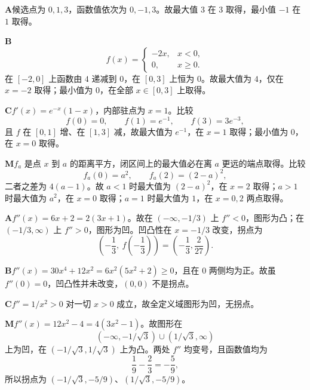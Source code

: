 \begin{solutionBox}
\textbf{A}\quad 候选点为 \(0,1,3\)，函数值依次为 \(0,-1,3\)。故最大值 \(3\) 在 \(3\) 取得，最小值 \(-1\) 在 \(1\) 取得。

\textbf{B}\quad
\[
f(x)=\begin{cases}-2x,&x<0,\\0,&x\ge0.\end{cases}
\]
在 \([-2,0]\) 上函数由 \(4\) 递减到 \(0\)，在 \([0,3]\) 上恒为 \(0\)。故最大值为 \(4\)，仅在 \(x=-2\) 取得；最小值为 \(0\)，在全部 \(x\in[0,3]\) 上取得。

\textbf{C}\quad \(f'(x)=e^{-x}(1-x)\)，内部驻点为 \(x=1\)。比较
\[
f(0)=0,\qquad f(1)=e^{-1},\qquad f(3)=3e^{-3},
\]
且 \(f\) 在 \([0,1]\) 增、在 \([1,3]\) 减，故最大值为 \(e^{-1}\)，在 \(x=1\) 取得；最小值为 \(0\)，在 \(x=0\) 取得。

\textbf{M}\quad \(f_a\) 是点 \(x\) 到 \(a\) 的距离平方，闭区间上的最大值必在离 \(a\) 更远的端点取得。比较
\[
f_a(0)=a^2,\qquad f_a(2)=(2-a)^2,
\]
二者之差为 \(4(a-1)\)。故 \(a<1\) 时最大值为 \((2-a)^2\)，在 \(x=2\) 取得；\(a>1\) 时最大值为 \(a^2\)，在 \(x=0\) 取得；\(a=1\) 时最大值为 \(1\)，在 \(x=0,2\) 两点取得。
\end{solutionBox}

\begin{solutionBox}
\textbf{A}\quad \(f''(x)=6x+2=2(3x+1)\)。故在 \((-\infty,-1/3)\) 上 \(f''<0\)，图形为凸；在 \((-1/3,\infty)\) 上 \(f''>0\)，图形为凹。凹凸性在 \(x=-1/3\) 改变，拐点为
\[
\left(-\frac13,\ f\!\left(-\frac13\right)\right)
=\left(-\frac13,\frac2{27}\right).
\]

\textbf{B}\quad \(f''(x)=30x^4+12x^2=6x^2(5x^2+2)\ge0\)，且在 \(0\) 两侧均为正。故虽 \(f''(0)=0\)，凹凸性并未改变，\((0,0)\) 不是拐点。

\textbf{C}\quad \(f''=1/x^2>0\) 对一切 \(x>0\) 成立，故全定义域图形为凹，无拐点。

\textbf{M}\quad \(f''(x)=12x^2-4=4(3x^2-1)\)。故图形在
\[
(-\infty,-1/\sqrt3)\cup(1/\sqrt3,\infty)
\]
上为凹，在 \((-1/\sqrt3,1/\sqrt3)\) 上为凸。两处 \(f''\) 均变号，且函数值均为
\[
\frac19-\frac23=-\frac59,
\]
所以拐点为 \(\left(-1/\sqrt3,-5/9\right)\)、\(\left(1/\sqrt3,-5/9\right)\)。
\end{solutionBox}

